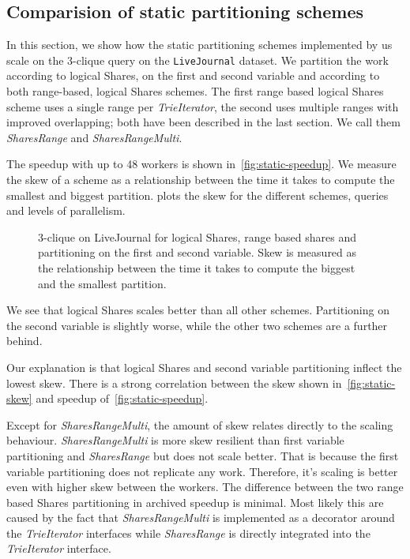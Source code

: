 
\subsection{Comparision of static partitioning schemes} \label{subsec:statical-partitioning-experiment}
In this section, we show how the static partitioning schemes implemented by us scale on the 3-clique query on the
\texttt{LiveJournal} dataset.
We partition the work according to logical Shares, on the first and second variable and according to both range-based, logical Shares schemes.
The first range based logical Shares scheme uses a single range per \textit{TrieIterator}, the second uses multiple ranges with improved
overlapping;
both have been described in the last section.
We call them \textit{SharesRange} and \textit{SharesRangeMulti}.

The speedup with up to 48 workers is shown in~\cref{fig:static-speedup}.
We measure the skew of a scheme as a relationship between the time it takes to compute the smallest and biggest partition.
 plots the skew for the different schemes, queries and levels of parallelism.

\begin{figure}
\caption{3-clique on LiveJournal for logical Shares, range based shares and partitioning on the first and second variable.
Skew is measured as the relationship between the time it takes to compute the biggest and the smallest partition.
}
\end{figure}

We see that logical Shares scales better than all other schemes.
Partitioning on the second variable is slightly worse, while the other two schemes are a further behind.

Our explanation is that logical Shares and second variable partitioning inflect the lowest skew.
There is a strong correlation between the skew shown in~\cref{fig:static-skew} and speedup of~\cref{fig:static-speedup}.

Except for \textit{SharesRangeMulti}, the amount of skew relates directly to the scaling behaviour.
\textit{SharesRangeMulti} is more skew resilient than first variable partitioning and \textit{SharesRange} but does not scale
better.
That is because the first variable partitioning does not replicate any work.
Therefore, it's scaling is better even with higher skew between the workers.
The difference between the two range based Shares partitioning in archived speedup is minimal.
Most likely this are caused by the fact that \textit{SharesRangeMulti} is implemented as a decorator around the
\textit{TrieIterator} interfaces while \textit{SharesRange} is directly integrated into the \textit{TrieIterator} interface.

